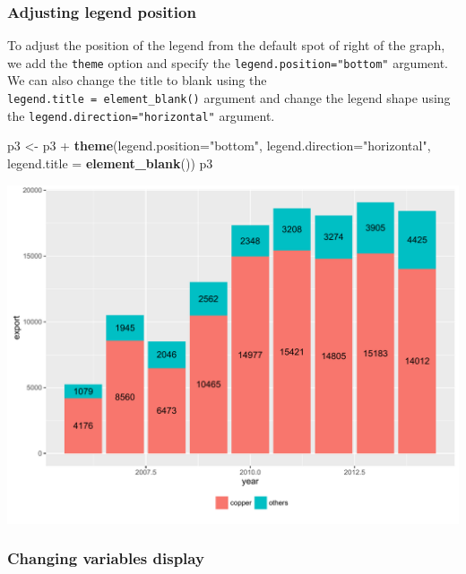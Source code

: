 \documentclass[]{article}
\newenvironment{Shaded}{\begin{snugshade}}{\end{snugshade}}
\newcommand{\KeywordTok}[1]{\textcolor[rgb]{0.13,0.29,0.53}{\textbf{{#1}}}}
\newcommand{\DataTypeTok}[1]{\textcolor[rgb]{0.13,0.29,0.53}{{#1}}}
\newcommand{\StringTok}[1]{\textcolor[rgb]{0.31,0.60,0.02}{{#1}}}
\newcommand{\NormalTok}[1]{{#1}}
\begin{document}
\subsubsection{Adjusting legend
position}\label{adjusting-legend-position-1}

To adjust the position of the legend from the default spot of right of
the graph, we add the \texttt{theme} option and specify the
\texttt{legend.position="bottom"} argument. We can also change the title
to blank using the \texttt{legend.title\ =\ element\_blank()} argument
and change the legend shape using the
\texttt{legend.direction="horizontal"} argument.

\begin{Shaded}
\begin{Highlighting}[]
\NormalTok{p3 <-}\StringTok{ }\NormalTok{p3 +}\StringTok{ }\KeywordTok{theme}\NormalTok{(}\DataTypeTok{legend.position=}\StringTok{"bottom"}\NormalTok{, }\DataTypeTok{legend.direction=}\StringTok{"horizontal"}\NormalTok{, }
                 \DataTypeTok{legend.title =} \KeywordTok{element_blank}\NormalTok{())}
\NormalTok{p3}
\end{Highlighting}
\end{Shaded}

\begin{center}\includegraphics{0_all_posts_pdf/bar_4-1} \end{center}

\subsubsection{Changing variables
display}\label{changing-variables-display-2}
\end{document}
